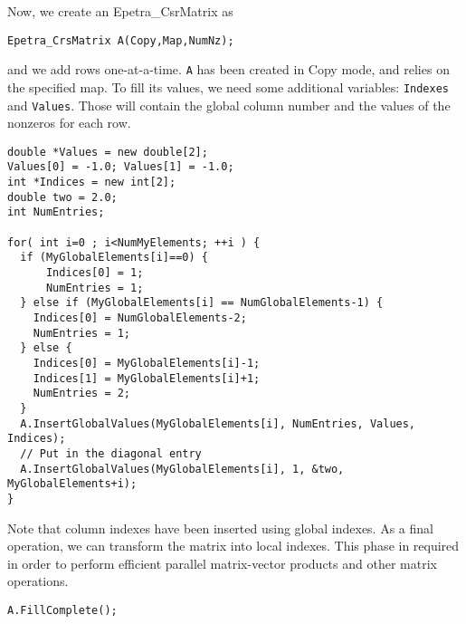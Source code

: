 Now, we create an Epetra\_CsrMatrix as
\begin{verbatim}
Epetra_CrsMatrix A(Copy,Map,NumNz);
\end{verbatim}
and we add rows one-at-a-time. \verb!A! has been created in Copy mode,
and relies on the specified map. To fill its values, we need some
additional variables: \verb!Indexes! and \verb!Values!. Those will
contain the global column number and the values of the nonzeros for each
row.
\begin{verbatim}
double *Values = new double[2];
Values[0] = -1.0; Values[1] = -1.0;
int *Indices = new int[2];
double two = 2.0;
int NumEntries;

for( int i=0 ; i<NumMyElements; ++i ) {
  if (MyGlobalElements[i]==0) {
      Indices[0] = 1;
      NumEntries = 1;
  } else if (MyGlobalElements[i] == NumGlobalElements-1) {
    Indices[0] = NumGlobalElements-2;
    NumEntries = 1;
  } else {
    Indices[0] = MyGlobalElements[i]-1;
    Indices[1] = MyGlobalElements[i]+1;
    NumEntries = 2;
  }
  A.InsertGlobalValues(MyGlobalElements[i], NumEntries, Values, Indices);
  // Put in the diagonal entry
  A.InsertGlobalValues(MyGlobalElements[i], 1, &two, MyGlobalElements+i);
}
\end{verbatim}

Note that column indexes have been inserted using global indexes.
As a final operation, we can transform the matrix into local
indexes. This phase in required in order to perform efficient parallel
matrix-vector products and other matrix operations.
\begin{verbatim}
A.FillComplete();
\end{verbatim}

